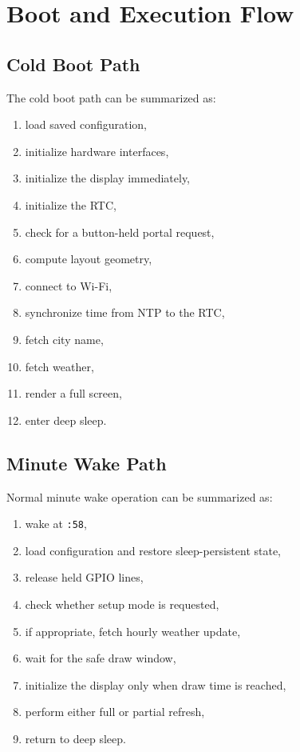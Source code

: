 \documentclass[11pt]{article}
\begin{document}
\section{Boot and Execution Flow}
\subsection{Cold Boot Path}
The cold boot path can be summarized as:
\begin{enumerate}
  \item load saved configuration,
  \item initialize hardware interfaces,
  \item initialize the display immediately,
  \item initialize the RTC,
  \item check for a button-held portal request,
  \item compute layout geometry,
  \item connect to Wi-Fi,
  \item synchronize time from NTP to the RTC,
  \item fetch city name,
  \item fetch weather,
  \item render a full screen,
  \item enter deep sleep.
\end{enumerate}

\subsection{Minute Wake Path}
Normal minute wake operation can be summarized as:
\begin{enumerate}
  \item wake at \texttt{:58},
  \item load configuration and restore sleep-persistent state,
  \item release held GPIO lines,
  \item check whether setup mode is requested,
  \item if appropriate, fetch hourly weather update,
  \item wait for the safe draw window,
  \item initialize the display only when draw time is reached,
  \item perform either full or partial refresh,
  \item return to deep sleep.
\end{enumerate}
\end{document}
